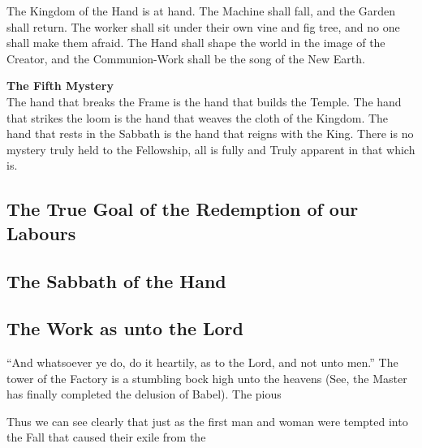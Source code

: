 The Kingdom of the Hand is at hand. The Machine shall fall, and the Garden shall return. The worker shall sit under their own vine and fig tree, and no one shall make them afraid. The Hand shall shape the world in the image of the Creator, and the Communion-Work shall be the song of the New Earth.

\textbf{The Fifth Mystery}\\
The hand that breaks the Frame is the hand that builds the Temple. The hand that strikes the loom is the hand that weaves the cloth of the Kingdom. The hand that rests in the Sabbath is the hand that reigns with the King. There is no mystery truly held to the Fellowship, all is fully and Truly apparent in that which is.

\subsection{The True Goal of the Redemption of our Labours}

\subsection{The Sabbath of the Hand}

\subsection{The Work as unto the Lord}
``And whatsoever ye do, do it heartily, as to the Lord, and not unto men.''
The tower of the Factory is a stumbling bock high unto the heavens (See, the Master has finally completed the delusion of Babel).
The pious


Thus we can see clearly that just as the first man and woman were tempted into the Fall that caused their exile from the